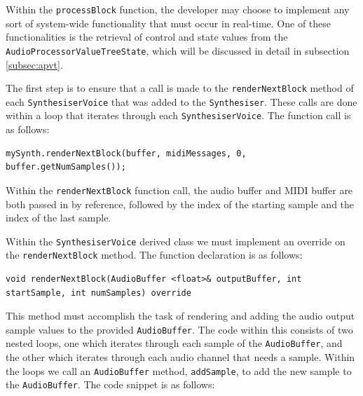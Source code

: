 \documentclass[a4paper,12pt]{report}
\begin{document}
Within the \texttt{processBlock} function, the developer may choose to implement any sort of system-wide functionality that must occur in real-time. One of these functionalities is the retrieval of control and state values from the \texttt{AudioProcessorValueTreeState}, which will be discussed in detail in subsection \ref{subsec:apvt}.

The first step is to ensure that a call is made to the \texttt{renderNextBlock} method of each \texttt{SynthesiserVoice} that was added to the \texttt{Synthesiser}. These calls are done within a loop that iterates through each \texttt{SynthesiserVoice}. The function call is as follows: 

 \noindent\begin{minipage}{\linewidth} \begin{lstlisting}[caption={renderNextBlock Function Call},label={code:rendernextblockfunccall},captionpos=b]
mySynth.renderNextBlock(buffer, midiMessages, 0, buffer.getNumSamples());
\end{lstlisting} \end{minipage}

Within the \texttt{renderNextBlock} function call, the audio buffer and MIDI buffer are both passed in by reference, followed by the index of the starting sample and the index of the last sample.

Within the \texttt{SynthesiserVoice} derived class we must implement an override on the \texttt{renderNextBlock} method. The function declaration is as follows:

 \noindent\begin{minipage}{\linewidth} \begin{lstlisting}[caption={renderNextBlock() Override},label={code:rendernextblockoverride},captionpos=b]
void renderNextBlock(AudioBuffer <float>& outputBuffer, int startSample, int numSamples) override
\end{lstlisting} \end{minipage}

This method must accomplish the task of rendering and adding the audio output sample values to the provided \texttt{AudioBuffer}. The code within this consists of two nested loops, one which iterates through each sample of the \texttt{AudioBuffer}, and the other which iterates through each audio channel that needs a sample. Within the loops we call an \texttt{AudioBuffer} method, \texttt{addSample}, to add the new sample to the \texttt{AudioBuffer}. The code snippet is as follows:
\end{document}
